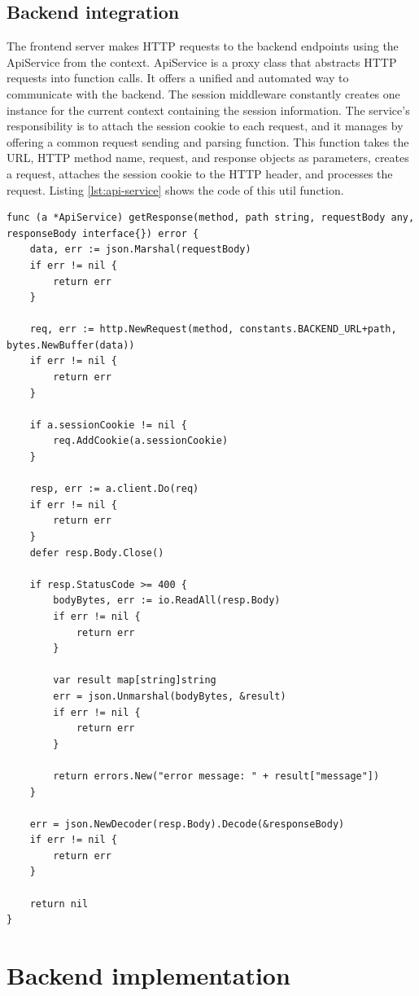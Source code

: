 \subsection{Backend integration}

The frontend server makes HTTP requests to the backend endpoints using the ApiService from the context. ApiService is a proxy class that abstracts HTTP requests into function calls. It offers a unified and automated way to communicate with the backend. The session middleware constantly creates one instance for the current context containing the session information. The service's responsibility is to attach the session cookie to each request, and it manages by offering a common request sending and parsing function. This function takes the URL, HTTP method name, request, and response objects as parameters, creates a request, attaches the session cookie to the HTTP header, and processes the request. Listing \ref{lst:api-service} shows the code of this util function.

\begin{lstlisting}[caption=ApiService code,label=lst:api-service]
func (a *ApiService) getResponse(method, path string, requestBody any, responseBody interface{}) error {
	data, err := json.Marshal(requestBody)
	if err != nil {
		return err
	}

	req, err := http.NewRequest(method, constants.BACKEND_URL+path, bytes.NewBuffer(data))
	if err != nil {
		return err
	}

	if a.sessionCookie != nil {
		req.AddCookie(a.sessionCookie)
	}

	resp, err := a.client.Do(req)
	if err != nil {
		return err
	}
	defer resp.Body.Close()

	if resp.StatusCode >= 400 {
		bodyBytes, err := io.ReadAll(resp.Body)
		if err != nil {
			return err
		}

		var result map[string]string
		err = json.Unmarshal(bodyBytes, &result)
		if err != nil {
			return err
		}

		return errors.New("error message: " + result["message"])
	}

	err = json.NewDecoder(resp.Body).Decode(&responseBody)
	if err != nil {
		return err
	}

	return nil
}
\end{lstlisting}

\section{Backend implementation}

